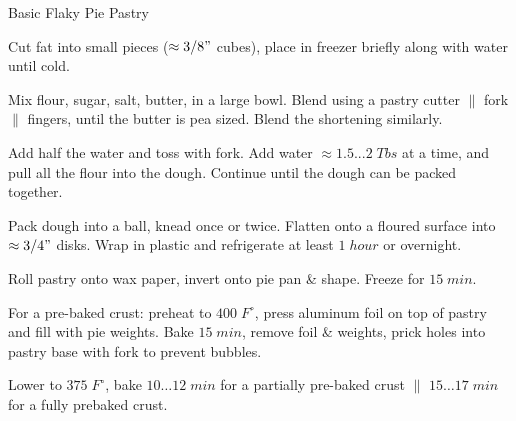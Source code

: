 \begin{recipe}[
preparationtime = 1 hour 30 minutes,
source = \citefield{pie2004}{title} \cite{pie2004}
]
{Basic Flaky Pie Pastry\label{basicFlakyPiePastry}}


\preparation
{
\step Cut fat into small pieces ($\approx 3/8"$ cubes), place in freezer briefly along with water until cold.

\step Mix flour, sugar, salt, butter, in a large bowl.
Blend using a pastry cutter $\|$ fork $\|$ fingers, until the butter is pea sized.
Blend the shortening similarly.

\step Add half the water and toss with fork.
Add water $\approx 1.5...2\; Tbs$ at a time, and pull all the flour into the dough.
Continue until the dough can be packed together.

\step Pack dough into a ball, knead once or twice.
Flatten onto a floured surface into $\approx 3/4"$ disks.
Wrap in plastic and refrigerate at least $1\; hour$ or overnight.

\step Roll pastry onto wax paper, invert onto pie pan \& shape. Freeze for $15 \; min$.

\step For a pre-baked crust: preheat to $400\; F^\circ$, press aluminum foil on top of pastry and fill with pie weights. Bake $15\; min$, remove foil \& weights, prick holes into pastry base with fork to prevent bubbles.

\step Lower to $375\; F^\circ$, bake $10 \dots 12\; min$ for a partially pre-baked crust $\|$ $15 \dots 17\; min$ for a fully prebaked crust.
}


\end{recipe}
